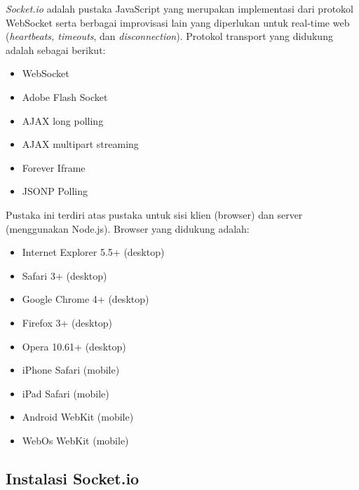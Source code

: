 \textit{Socket.io} adalah pustaka JavaScript yang merupakan implementasi dari protokol WebSocket serta berbagai improvisasi lain yang diperlukan untuk real-time web (\textit{heartbeats, timeouts}, dan \textit{disconnection}). Protokol transport yang didukung adalah sebagai berikut:
\begin{itemize}
\item WebSocket
\item Adobe Flash Socket
\item AJAX long polling
\item AJAX multipart streaming
\item Forever Iframe
\item JSONP Polling
\end{itemize}
Pustaka ini terdiri atas pustaka untuk sisi klien (browser) dan server (menggunakan Node.js). Browser yang didukung adalah:
\begin{itemize}
\item Internet Explorer 5.5+ (desktop)
\item Safari 3+ (desktop)
\item Google Chrome 4+ (desktop)
\item Firefox 3+ (desktop)
\item Opera 10.61+ (desktop)
\item iPhone Safari (mobile)
\item iPad Safari (mobile)
\item Android WebKit (mobile)
\item WebOs WebKit (mobile)
\end{itemize}

\subsection{Instalasi Socket.io}

